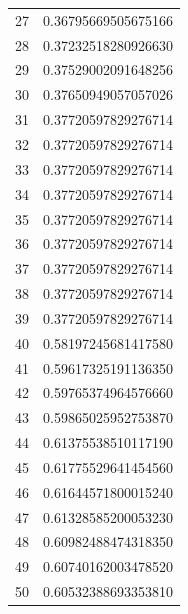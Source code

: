 \begin{table}[H]
\begin{minipage}{.5\linewidth}
\begin{tabular}{@{}cl@{}}
          27 & 0.36795669505675166 \\ 
          28 & 0.37232518280926630 \\
          29 & 0.37529002091648256 \\
          30 & 0.37650949057057026 \\
          31 & 0.37720597829276714 \\
          32 & 0.37720597829276714 \\
          33 & 0.37720597829276714 \\
          34 & 0.37720597829276714 \\
          35 & 0.37720597829276714 \\
          36 & 0.37720597829276714 \\
          37 & 0.37720597829276714 \\
          38 & 0.37720597829276714 \\
          39 & 0.37720597829276714 \\
          40 & 0.58197245681417580 \\
          41 & 0.59617325191136350 \\
          42 & 0.59765374964576660 \\
          43 & 0.59865025952753870 \\
          44 & 0.61375538510117190 \\
          45 & 0.61775529641454560 \\
          46 & 0.61644571800015240 \\
          47 & 0.61328585200053230 \\
          48 & 0.60982488474318350 \\
          49 & 0.60740162003478520 \\
          50 & 0.60532388693353810 \\ \bottomrule
      \end{tabular}
    \end{minipage}
\end{table}